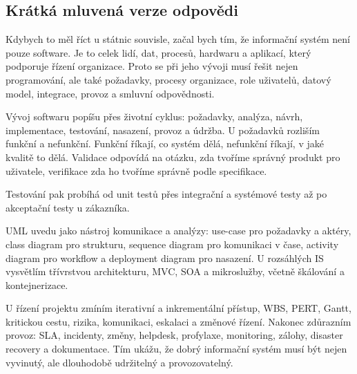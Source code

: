 \subsection*{Krátká mluvená verze odpovědi}

Kdybych to měl říct u státnic souvisle, začal bych tím, že informační systém není pouze software. Je to celek lidí, dat, procesů, hardwaru a aplikací, který podporuje řízení organizace. Proto se při jeho vývoji musí řešit nejen programování, ale také požadavky, procesy organizace, role uživatelů, datový model, integrace, provoz a smluvní odpovědnosti.

Vývoj softwaru popíšu přes životní cyklus: požadavky, analýza, návrh, implementace, testování, nasazení, provoz a údržba. U požadavků rozliším funkční a nefunkční. Funkční říkají, co systém dělá, nefunkční říkají, v jaké kvalitě to dělá. Validace odpovídá na otázku, zda tvoříme správný produkt pro uživatele, verifikace zda ho tvoříme správně podle specifikace.

Testování pak probíhá od unit testů přes integrační a systémové testy až po akceptační testy u zákazníka.

UML uvedu jako nástroj komunikace a analýzy: use-case pro požadavky a aktéry, class diagram pro strukturu, sequence diagram pro komunikaci v čase, activity diagram pro workflow a deployment diagram pro nasazení. U rozsáhlých IS vysvětlím třívrstvou architekturu, MVC, SOA a mikroslužby, včetně škálování a kontejnerizace.

U řízení projektu zmíním iterativní a inkrementální přístup, WBS, PERT, Gantt, kritickou cestu, rizika, komunikaci, eskalaci a změnové řízení. Nakonec zdůrazním provoz: SLA, incidenty, změny, helpdesk, profylaxe, monitoring, zálohy, disaster recovery a dokumentace. Tím ukážu, že dobrý informační systém musí být nejen vyvinutý, ale dlouhodobě udržitelný a provozovatelný.

\newpage

